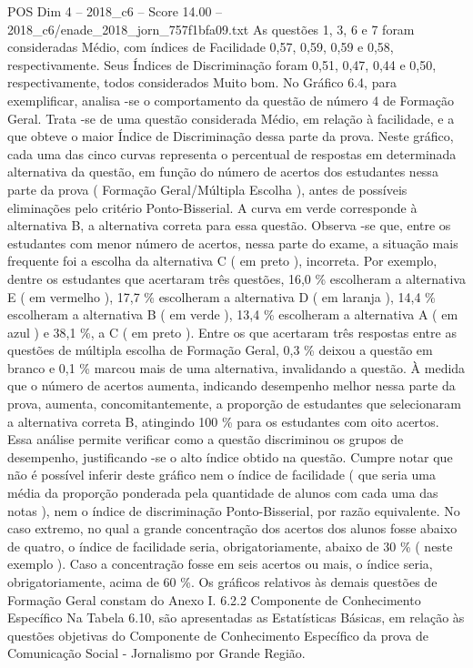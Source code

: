 \begin{textsample}{POS Dim 4 – 2018\_c6 – Score 14.00 – 2018\_c6/enade\_2018\_jorn\_757f1bfa09.txt}
As questões 1, 3, 6 e 7 foram consideradas Médio, com índices de Facilidade 0,57, 0,59, 0,59 e 0,58, respectivamente.
Seus Índices de Discriminação foram 0,51, 0,47, 0,44 e 0,50, respectivamente, todos considerados Muito bom.
No Gráfico 6.4, para exemplificar, analisa -se o comportamento da questão de número 4 de Formação Geral.
Trata -se de uma questão considerada Médio, em relação à facilidade, e a que obteve o maior Índice de Discriminação dessa parte da prova.
Neste gráfico, cada uma das cinco curvas representa o percentual de respostas em determinada alternativa da questão, em função do número de acertos dos estudantes nessa parte da prova ( Formação Geral/Múltipla Escolha ), antes de possíveis eliminações pelo critério Ponto-Bisserial.
A curva em verde corresponde à alternativa B, a alternativa correta para essa questão.
Observa -se que, entre os estudantes com menor número de acertos, nessa parte do exame, a situação mais frequente foi a escolha da alternativa C ( em preto ), incorreta.
Por exemplo, dentre os estudantes que acertaram três questões, 16,0 \% escolheram a alternativa E ( em vermelho ), 17,7 \% escolheram a alternativa D ( em laranja ), 14,4 \% escolheram a alternativa B ( em verde ), 13,4 \% escolheram a alternativa A ( em azul ) e 38,1 \%, a C ( em preto ).
Entre os que acertaram três respostas entre as questões de múltipla escolha de Formação Geral, 0,3 \% deixou a questão em branco e 0,1 \% marcou mais de uma alternativa, invalidando a questão.
À medida que o número de acertos aumenta, indicando desempenho melhor nessa parte da prova, aumenta, concomitantemente, a proporção de estudantes que selecionaram a alternativa correta B, atingindo 100 \% para os estudantes com oito acertos.
Essa análise permite verificar como a questão discriminou os grupos de desempenho, justificando -se o alto índice obtido na questão.
Cumpre notar que não é possível inferir deste gráfico nem o índice de facilidade ( que seria uma média da proporção ponderada pela quantidade de alunos com cada uma das notas ), nem o índice de discriminação Ponto-Bisserial, por razão equivalente.
No caso extremo, no qual a grande concentração dos acertos dos alunos fosse abaixo de quatro, o índice de facilidade seria, obrigatoriamente, abaixo de 30 \% ( neste exemplo ).
Caso a concentração fosse em seis acertos ou mais, o índice seria, obrigatoriamente, acima de 60 \%.
Os gráficos relativos às demais questões de Formação Geral constam do Anexo I. 6.2.2 Componente de Conhecimento Específico Na Tabela 6.10, são apresentadas as Estatísticas Básicas, em relação às questões objetivas do Componente de Conhecimento Específico da prova de Comunicação Social - Jornalismo por Grande Região.

\end{textsample}
